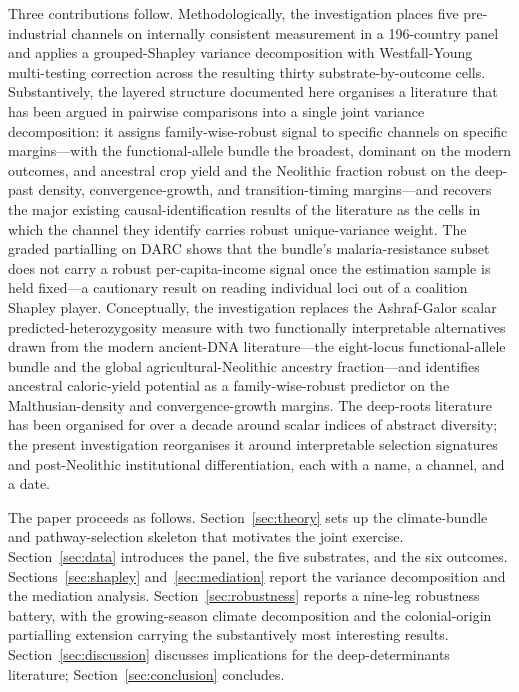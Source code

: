 \documentclass[11pt,letterpaper]{article}
\begin{document}
Three contributions follow. Methodologically, the investigation places five pre-industrial channels on internally consistent measurement in a 196-country panel and applies a grouped-Shapley variance decomposition with Westfall-Young multi-testing correction across the resulting thirty substrate-by-outcome cells. Substantively, the layered structure documented here organises a literature that has been argued in pairwise comparisons into a single joint variance decomposition: it assigns family-wise-robust signal to specific channels on specific margins---with the functional-allele bundle the broadest, dominant on the modern outcomes, and ancestral crop yield and the Neolithic fraction robust on the deep-past density, convergence-growth, and transition-timing margins---and recovers the major existing causal-identification results of the literature as the cells in which the channel they identify carries robust unique-variance weight. The graded partialling on DARC shows that the bundle's malaria-resistance subset does not carry a robust per-capita-income signal once the estimation sample is held fixed---a cautionary result on reading individual loci out of a coalition Shapley player. Conceptually, the investigation replaces the Ashraf-Galor scalar predicted-heterozygosity measure with two functionally interpretable alternatives drawn from the modern ancient-DNA literature---the eight-locus functional-allele bundle and the global agricultural-Neolithic ancestry fraction---and identifies ancestral caloric-yield potential as a family-wise-robust predictor on the Malthusian-density and convergence-growth margins. The deep-roots literature has been organised for over a decade around scalar indices of abstract diversity; the present investigation reorganises it around interpretable selection signatures and post-Neolithic institutional differentiation, each with a name, a channel, and a date.

The paper proceeds as follows. Section~\ref{sec:theory} sets up the climate-bundle and pathway-selection skeleton that motivates the joint exercise. Section~\ref{sec:data} introduces the panel, the five substrates, and the six outcomes. Sections~\ref{sec:shapley} and~\ref{sec:mediation} report the variance decomposition and the mediation analysis. Section~\ref{sec:robustness} reports a nine-leg robustness battery, with the growing-season climate decomposition and the colonial-origin partialling extension carrying the substantively most interesting results. Section~\ref{sec:discussion} discusses implications for the deep-determinants literature; Section~\ref{sec:conclusion} concludes.
\end{document}

